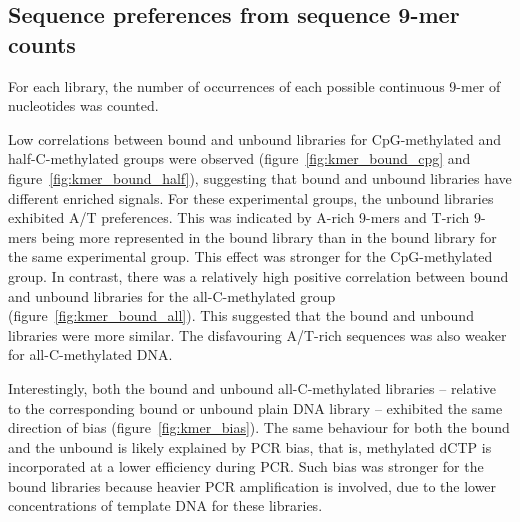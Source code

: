 \documentclass[a4paper, numbers=noenddot]{scrbook}
\begin{document}
\subsection{Sequence preferences from sequence 9-mer counts}
\label{ssec:nuseqpref_kmer}

For each library, the number of occurrences of each possible continuous 9-mer of nucleotides was counted.

Low correlations between bound and unbound libraries for CpG-methylated and half-C-methylated groups were observed (figure~\ref{fig:kmer_bound_cpg} and figure~\ref{fig:kmer_bound_half}), suggesting that bound and unbound libraries have different enriched signals.  For these experimental groups, the unbound libraries exhibited A/T preferences.  This was indicated by A-rich 9-mers and T-rich 9-mers being more represented in the bound library than in the bound library for the same experimental group.  This effect was stronger for the CpG-methylated group.  In contrast, there was a relatively high positive correlation between bound and unbound libraries for the all-C-methylated group (figure~\ref{fig:kmer_bound_all}).  This suggested that the bound and unbound libraries were more similar. The disfavouring A/T-rich sequences was also weaker for all-C-methylated DNA.

Interestingly, both the bound and unbound all-C-methylated libraries -- relative to the corresponding bound or unbound plain DNA library -- exhibited the same direction of bias (figure~\ref{fig:kmer_bias}).  The same behaviour for both the bound and the unbound is likely explained by PCR bias, that is, methylated dCTP is incorporated at a lower efficiency during PCR.  Such bias was stronger for the bound libraries because heavier PCR amplification is involved, due to the lower concentrations of template DNA for these libraries.
\end{document}

